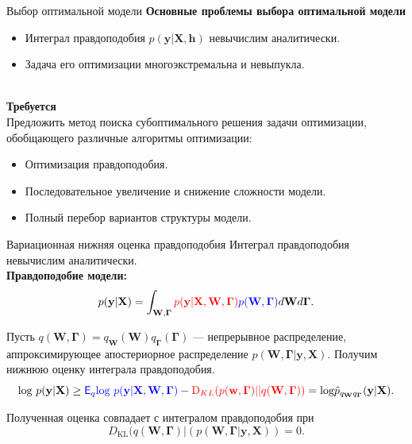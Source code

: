 \documentclass[usenames,dvipsnames,11pt,pdf,utf8,russian,aspectratio=43]{beamer}
\begin{document}
\begin{frame}{Выбор оптимальной модели}
\textbf{Основные проблемы выбора оптимальной модели}\\
\begin{itemize}
\item Интеграл правдоподобия $p(\mathbf{y}|\mathbf{X}, \mathbf{h})$  невычислим аналитически.
\item Задача его оптимизации многоэкстремальна и невыпукла.
\end{itemize}
~\\
\textbf{Требуется}\\ 
Предложить метод поиска субоптимального решения задачи оптимизации, обобщающего различные алгоритмы оптимизации:
\begin{itemize}
\item Оптимизация правдоподобия.
\item Последовательное увеличение и снижение сложности модели.
\item Полный перебор вариантов структуры модели.
\end{itemize}

\end{frame}    

                                                                                                              

\begin{frame}{Вариационная нижняя оценка правдоподобия} 
Интеграл правдоподобия невычислим аналитически.\\
\textbf{Правдоподобие модели:}
\[
p(\mathbf{y}|\mathbf{X}) =
 \int_{\mathbf{W}, \boldsymbol{\Gamma} } \textcolor{red}{p(\mathbf{y}|\mathbf{X},\mathbf{W},  \boldsymbol{\Gamma})} \textcolor{blue}{p(\mathbf{W}, \boldsymbol{\Gamma})}d\mathbf{W}d{\boldsymbol{\Gamma}}.                         
\]

Пусть $q(\mathbf{W}, \boldsymbol{\Gamma}) = q_{\mathbf{W}}(\mathbf{W})q_{\boldsymbol{\Gamma}}(\boldsymbol{\Gamma})$ --- непрерывное распределение, аппроксимирующее 
апостериорное распределение $p(\mathbf{W}, \boldsymbol{\Gamma}|\mathbf{y}, \mathbf{X})$.
Получим нижнюю оценку интеграла правдоподобия.\\
$$                                                                                                                                              
        \text{log}~p(\mathbf{y}|\mathbf{X}) \geq 
\textcolor{blue}{\mathsf{E}_q \text{log}~{p(\mathbf{y} | \mathbf{X}, \mathbf{W}, \boldsymbol{\Gamma})}} - \textcolor{red}{\text{D}_{KL}(p(\mathbf{w}, \boldsymbol{\Gamma}) || q(\mathbf{W}, \boldsymbol{\Gamma}))} = \text{log}\hat{{p}}_{q_{\mathbf{W}}q_{\boldsymbol{\Gamma}}}(\mathbf{y}|\mathbf{X}).
$$ 

Полученная оценка совпадает с интегралом правдоподобия при $$D_\text{KL}(q(\mathbf{W}, \boldsymbol{\Gamma})|(p(\mathbf{W}, \boldsymbol{\Gamma}|\mathbf{y}, \mathbf{X}))=0.$$

\end{frame}      
\end{document}
